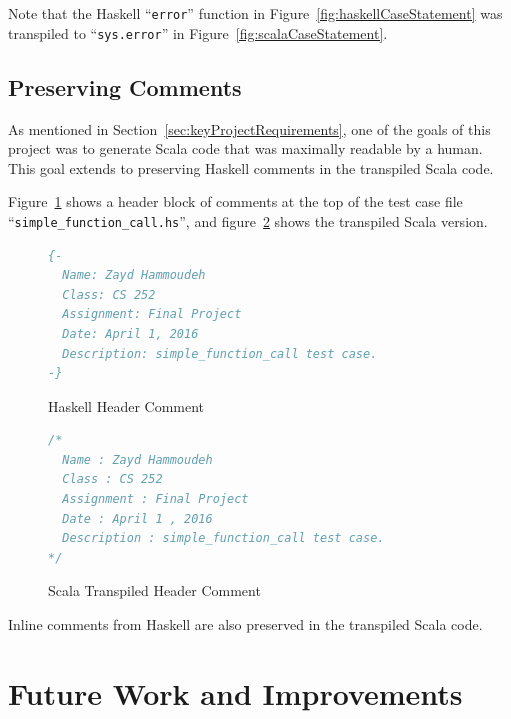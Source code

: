 \documentclass{report}
\begin{document}
Note that the Haskell ``\texttt{error}'' function in Figure~\ref{fig:haskellCaseStatement} was transpiled to ``\texttt{sys.error}'' in Figure~\ref{fig:scalaCaseStatement}.

\subsection{Preserving Comments}\label{sec:preservingComments}

As mentioned in Section~\ref{sec:keyProjectRequirements}, one of the goals of this project was to generate Scala code that was maximally readable by a human.  This goal extends to preserving Haskell comments in the transpiled Scala code.

Figure~\ref{fig:haskellHeaderComments} shows a header block of comments at the top of the test case file ``\texttt{simple\_function\_call.hs}'', and figure~\ref{fig:scalaHeaderComments} shows the transpiled Scala version.  

\begin{figure}[H]
\begin{mdframed}
\begin{lstlisting}[language=Haskell]
{-
  Name: Zayd Hammoudeh
  Class: CS 252
  Assignment: Final Project
  Date: April 1, 2016
  Description: simple_function_call test case.
-}
\end{lstlisting}
\end{mdframed}
\caption{Haskell Header Comment}\label{fig:haskellHeaderComments}
\end{figure}

\begin{figure}[H]
\begin{mdframed}
\begin{lstlisting}[language=Scala]
/*
  Name : Zayd Hammoudeh
  Class : CS 252
  Assignment : Final Project
  Date : April 1 , 2016
  Description : simple_function_call test case.
*/
\end{lstlisting}
\end{mdframed}
\caption{Scala Transpiled Header Comment}\label{fig:scalaHeaderComments}
\end{figure}

Inline comments from Haskell are also preserved in the transpiled Scala code.

\section{Future Work and Improvements}
\end{document}
